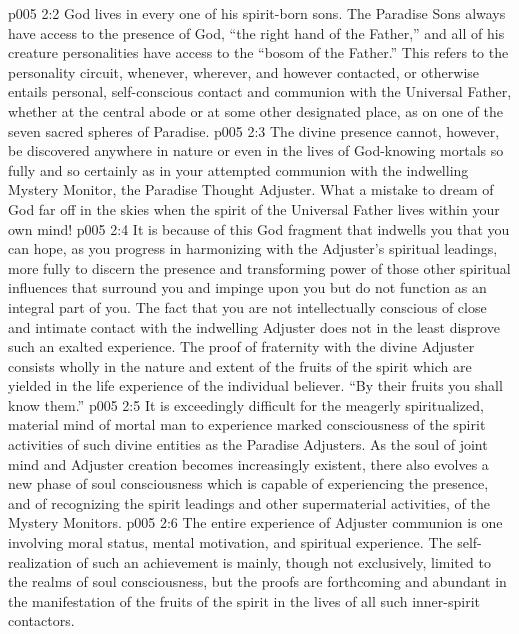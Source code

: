 \vs p005 2:2 God lives in every one of his spirit\hyp{}born sons. The Paradise Sons always have access to the presence of God, “the right hand of the Father,” and all of his creature personalities have access to the “bosom of the Father.” This refers to the personality circuit, whenever, wherever, and however contacted, or otherwise entails personal, self\hyp{}conscious contact and communion with the Universal Father, whether at the central abode or at some other designated place, as on one of the seven sacred spheres of Paradise.
\vs p005 2:3 The divine presence cannot, however, be discovered anywhere in nature or even in the lives of God\hyp{}knowing mortals so fully and so certainly as in your attempted communion with the indwelling Mystery Monitor, the Paradise Thought Adjuster. What a mistake to dream of God far off in the skies when the spirit of the Universal Father lives within your own mind!
\vs p005 2:4 \pc It is because of this God fragment that indwells you that you can hope, as you progress in harmonizing with the Adjuster’s spiritual leadings, more fully to discern the presence and transforming power of those other spiritual influences that surround you and impinge upon you but do not function as an integral part of you. The fact that you are not intellectually conscious of close and intimate contact with the indwelling Adjuster does not in the least disprove such an exalted experience. The proof of fraternity with the divine Adjuster consists wholly in the nature and extent of the fruits of the spirit which are yielded in the life experience of the individual believer. \textcolor{ubdarkred}{“By their fruits you shall know them.”}
\vs p005 2:5 It is exceedingly difficult for the meagerly spiritualized, material mind of mortal man to experience marked consciousness of the spirit activities of such divine entities as the Paradise Adjusters. As the soul of joint mind and Adjuster creation becomes increasingly existent, there also evolves a new phase of soul consciousness which is capable of experiencing the presence, and of recognizing the spirit leadings and other supermaterial activities, of the Mystery Monitors.
\vs p005 2:6 The entire experience of Adjuster communion is one involving moral status, mental motivation, and spiritual experience. The self\hyp{}realization of such an achievement is mainly, though not exclusively, limited to the realms of soul consciousness, but the proofs are forthcoming and abundant in the manifestation of the fruits of the spirit in the lives of all such inner\hyp{}spirit contactors.
